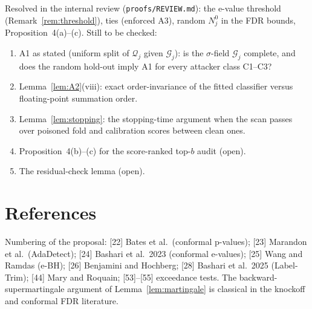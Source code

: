 \documentclass[11pt]{article}
\theoremstyle{definition}
\theoremstyle{remark}
\newcommand{\G}{\mathcal{G}}
\newcommand{\Q}{\mathcal{Q}}
\newcommand{\1}{\mathbf{1}}
\begin{document}
Resolved in the internal review (\texttt{proofs/REVIEW.md}): the e-value threshold (Remark~\ref{rem:threshold}),
ties (enforced A3), random $N_j^0$ in the FDR bounds, Proposition~4(a)--(c). Still to be checked:
\begin{enumerate}[leftmargin=*]
\item A1 as stated (uniform split of $\Q_j$ given $\G_j$): is the $\sigma$-field $\G_j$ complete,
  and does the random hold-out imply A1 for every attacker class C1--C3?
\item Lemma~\ref{lem:A2}(viii): exact order-invariance of the fitted classifier versus
  floating-point summation order.
\item Lemma~\ref{lem:stopping}: the stopping-time argument when the scan passes over poisoned
  fold and calibration scores between clean ones.
\item Proposition~4(b)--(c) for the score-ranked top-$b$ audit (open).
\item The residual-check lemma (open).
\end{enumerate}

\section*{References}
Numbering of the proposal: [22] Bates et al.\ (conformal p-values); [23] Marandon et al.\
(AdaDetect); [24] Bashari et al.\ 2023 (conformal e-values); [25] Wang and Ramdas (e-BH);
[26] Benjamini and Hochberg; [28] Bashari et al.\ 2025 (Label-Trim); [44] Mary and Roquain;
[53]--[55] exceedance tests. The backward-supermartingale argument of Lemma~\ref{lem:martingale}
is classical in the knockoff and conformal FDR literature.
\end{document}
